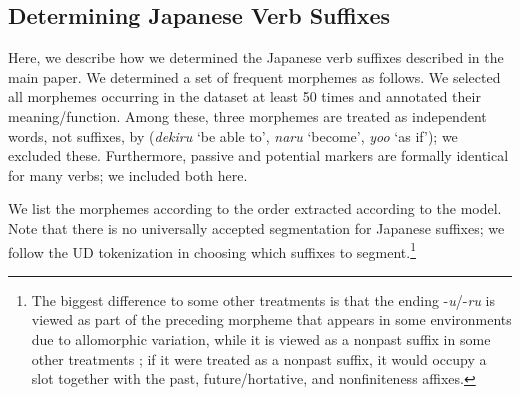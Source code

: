 \documentclass[11pt,letterpaper]{article}
\begin{document}
\subsection{Determining Japanese Verb Suffixes}

Here, we describe how we determined the Japanese verb suffixes described in the main paper.
We determined a set of frequent morphemes as follows.
We selected all morphemes occurring in the dataset at least 50 times and annotated their meaning/function.
Among these, three morphemes are treated as independent words, not suffixes, by \cite{kaiser2013japanese} (\textit{dekiru} `be able to', \textit{naru} `become', \textit{yoo} `as if'); we excluded these.
Furthermore, passive and potential markers are formally identical for many verbs; we included both here.

We list the morphemes according to the order extracted according to the model.
Note that there  is no universally accepted segmentation for Japanese suffixes; we follow the UD tokenization in choosing which suffixes to segment.\footnote{The biggest difference to some other treatments is that the ending -\textit{u}/-\textit{ru} is viewed as part of the preceding morpheme that appears in some environments due to allomorphic variation, while it is viewed as a nonpast suffix in some other treatments \citep[p.116]{hasegawa2014japanese}; if it were treated as a nonpast suffix, it would occupy a slot together with the past, future/hortative, and nonfiniteness affixes.}
\end{document}
